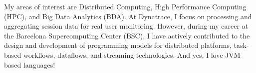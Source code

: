 %
%
%

\par{
My areas of interest are Distributed Computing, High Performance Computing (HPC), and Big Data Analytics (BDA). At Dynatrace, I focus on processing and aggregating session data for real user monitoring. However, during my career at the Barcelona Supercomputing Center (BSC), I have actively contributed to the design and development of programming models for distributed platforms, task-based workflows, dataflows, and streaming technologies. And yes, I love JVM-based languages!
}

\vspace{0.5em}